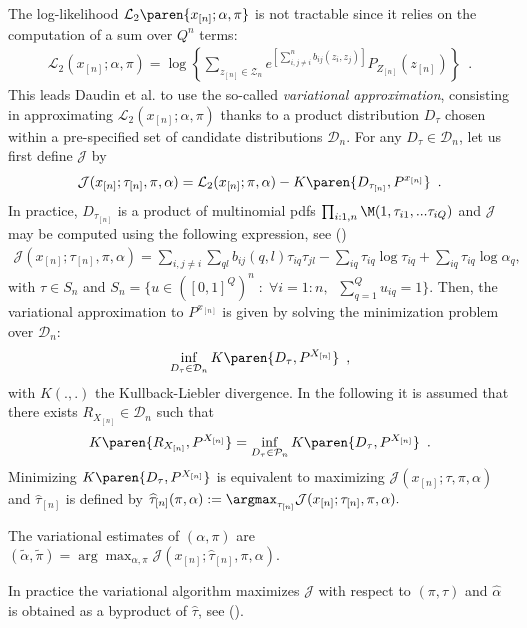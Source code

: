\documentclass[11pt]{article}
\newcommand{\Zdefn}{\mathcal{Z}_{n}}
\newcommand{\Xn}{X_{[n]}}
\newcommand{\xn}{x_{[n]}}
\newcommand{\Zn}{Z_{[n]}}
\newcommand{\zn}{z_{[n]}}
\newcommand{\taun}{\tau_{[n]}}
\renewcommand{\L}{\mathcal{L}}
\newcommand{\J}{\mathcal{J}}
\newcommand{\tah}{\widehat{\tau}}
\newcommand{\tahn}{\tah_{[n]}}
\begin{document}
The log-likelihood  $\L_2\paren{\xn; \alpha,\pi}$ is not tractable since it relies on the computation of a sum over $Q^n$ terms:
\begin{align*}
\L_2(\xn; \alpha,\pi)= \log \left\{ \sum_{z_{[n]} \in \Zdefn} e^{\left[ \sum_{i,j \neq i}^n b_{ij}(z_i,z_j) \right]} P_{\Zn}(\zn) \right\}      \enspace.
\end{align*}
 This leads Daudin et al.\cite{DPR} to use the so-called {\em variational approximation}, consisting in approximating $\L_2(\xn; \alpha,\pi)$ thanks to a product distribution $D_{\tau}$ chosen within a pre-specified set of candidate distributions $\mathcal{D}_n$.
%
For any $D_{\tau}\in\mathcal{D}_n$, let us first define $\J$ by
\begin{align*}
     \J(\xn; \taun, \pi, \alpha) = \L_2(\xn;  \pi, \alpha) - K\paren{D_{\taun},P^{\xn}}\enspace.
 \end{align*}
In practice, $D_{\taun}$ is a product of multinomial pdfs $\prod_{i:1,n}\M(1,\tau_{i1}, ...\tau_{iQ})$ and $\J$ may be computed using the following expression, see (\cite{DPR})
\begin{align*}
\J(\xn; \taun, \pi, \alpha)= \sum_{i,j \neq i} \sum_{ql} b_{ij}(q,l)\tau_{iq}\tau_{jl}-\sum_{iq}\tau_{iq}\log\tau_{iq}+\sum_{iq}\tau_{iq}\log\alpha_{q},
\end{align*}
with $\tau \in S_n$ and $S_n=\{u \in ([0,1]^Q)^n \; : \; \forall i=1:n, \; \; \sum _{q=1}^Q u_{iq}=1 \}.$
Then, the variational approximation to $P^{\xn}$ is given by solving the minimization problem over $\mathcal{D}_n$:
\begin{align*}
    \inf _{D_{\tau}\in\mathcal{D}_n} K\paren{D_{\tau},P^{\Xn}}\enspace,
 \end{align*}
 with $K(.,.)$  the Kullback-Liebler divergence.
%
In the following it is assumed that there exists $R_{\Xn} \in\mathcal{D}_n$ such that
\begin{align*}
        K\paren{R_{\Xn},P^{\Xn}} = \inf _{D_{\tau}\in\mathcal{P}_n} K\paren{D_{\tau},P^{\Xn}}\enspace.
\end{align*}
Minimizing $K\paren{D_{\tau},P^{\Xn}}$ is equivalent to maximizing
     $\J(\xn; \tau, \pi, \alpha) $
and $\tahn$ is defined by $\tahn(\pi,\alpha):=\argmax_{\taun} \J(\xn; \taun,\pi,\alpha).$

The variational estimates of $(\alpha,\pi)$ are $(\widetilde{\alpha},\widetilde{\pi})=\arg\max_{\alpha,\pi}\J(\xn; \tahn, \pi, \alpha).$

In practice the variational algorithm maximizes $\J$ with respect to $(\pi,\tau)$ and $\widehat{\alpha}$ is obtained as a byproduct of $\widehat{\tau}$, see (\cite{DPR}).
\end{document}
